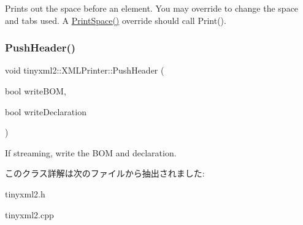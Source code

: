 Prints out the space before an element. You may override to change the space and tabs used. A \hyperlink{classtinyxml2_1_1_x_m_l_printer_a1c4b2ccbe4fdb316d54f5a93f3559260}{Print\+Space()} override should call Print(). \mbox{\label{classtinyxml2_1_1_x_m_l_printer_a178c608ce8476043d5d6513819cde903}} 
\subsubsection{\texorpdfstring{Push\+Header()}{PushHeader()}}
{\footnotesize\ttfamily void tinyxml2\+::\+X\+M\+L\+Printer\+::\+Push\+Header (\begin{DoxyParamCaption}\item[{bool}]{write\+B\+OM,  }\item[{bool}]{write\+Declaration }\end{DoxyParamCaption})}

If streaming, write the B\+OM and declaration. 

このクラス詳解は次のファイルから抽出されました\+:\begin{DoxyCompactItemize}
\item 
tinyxml2.\+h\item 
tinyxml2.\+cpp\end{DoxyCompactItemize}
